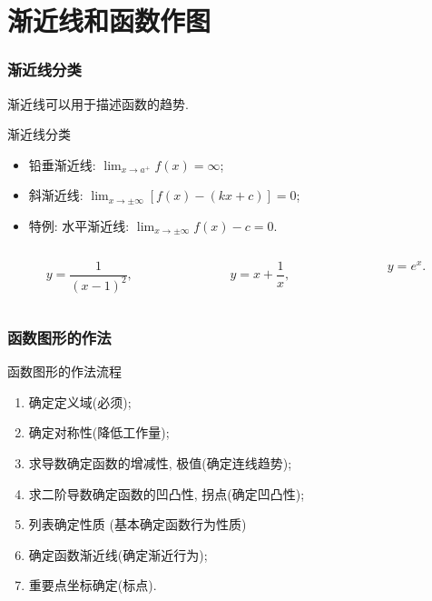 \documentclass[
10pt,
aspectratio=43,
]{beamer}
\begin{document}
\section{渐近线和函数作图}
\begin{frame}
	\frametitle{渐近线分类}
	渐近线可以用于描述函数的趋势.
	\vspace{0.3cm}
	\begin{block}{渐近线分类}
		\begin{itemize}
			\item 铅垂渐近线: $\lim_{x\to a^+} f(x) = \infty$;
			\item 斜渐近线: $\lim_{x\to \pm\infty}\left[f(x)-(kx+c)\right]=0$;
			\item 特例: 水平渐近线: $\lim_{x\to \pm\infty}f(x)-c=0$.
		\end{itemize}
	\end{block}
	\vspace{1.2cm}
	\begin{columns}[T]
		\begin{column}{0.33\textwidth}
			\begin{equation*}
				y = \frac{1}{(x-1)^2},
			\end{equation*}
		\end{column}
		\begin{column}{0.33\textwidth}
			\begin{equation*}
				y = x+\frac{1}{x},
			\end{equation*}
		\end{column}
		\begin{column}{0.33\textwidth}
			\begin{equation*}
				y = e^{x}.
			\end{equation*}
		\end{column}
	\end{columns}
\end{frame}

\begin{frame}
	\frametitle{函数图形的作法}
	\begin{block}{函数图形的作法流程}
		\begin{enumerate}
			\item 确定定义域(必须);
			      \pause
			\item 确定对称性(降低工作量);
			      \pause
			\item 求导数确定函数的增减性, 极值(确定连线趋势);
			      \pause
			\item 求二阶导数确定函数的凹凸性, 拐点(确定凹凸性);
			      \pause
			\item 列表确定性质 (基本确定函数行为性质)
			      \pause
			\item 确定函数渐近线(确定渐近行为);
			      \pause
			\item 重要点坐标确定(标点).
		\end{enumerate}
	\end{block}
\end{frame}
\end{document}

